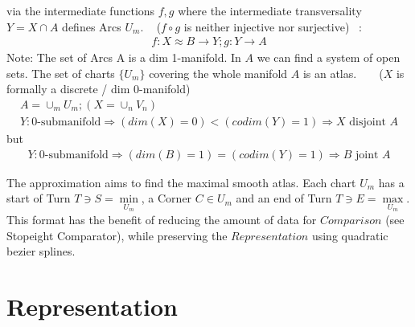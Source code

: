 \documentclass{report}
\begin{document}
via the intermediate functions $f,g$ where the intermediate transversality $Y = X \cap A$ defines Arcs $U_{m}$. ~\cite[]{Loring} ($f \circ g$ is neither injective nor surjective) ~\cite[]{LauresSzymik}:
\begin{align}
f: X \approx B \rightarrow Y; g: Y \rightarrow A
\end{align}
Note: The set of Arcs A is a dim 1-manifold. In $A$ we can find a system of open sets. The set of charts $\{U_{m}\}$ covering the whole manifold $A$ is an atlas. ~\cite[.1.]{Fomenko} ~\cite[]{Wall} ($X$ is formally a discrete / dim 0-manifold)
\begin{align}
A = \cup_{m}U_{m}; (X = \cup_{n}V_{n})\\
Y: \text{0-submanifold} \Rightarrow (dim(X)=0)<(codim(Y)=1) \Rightarrow X \text{ disjoint } A
\end{align}
but
\begin{align}
Y: \text{0-submanifold} \Rightarrow (dim(B)=1)=(codim(Y)=1) \Rightarrow B \text{ joint } A
\end{align}
\iffalse
Within $f$ we are assigning a sequence of three points to compact Hausdorf invervals ~\cite[\nopp 6.1.3.]{Mortad}:
\begin{equation}
\{x_{n}\}_{n \in \mathbb{N}} \mapsto \{S,C,E\}
\end{equation}\\
\fi
The approximation aims to find the maximal smooth atlas. Each chart $U_{m}$ has a start of Turn $T \ni S = \min \limits _{U_{m}}$, a Corner $C \in U_{m}$ and an end of Turn $T \ni E = \max \limits _{U_{m}}$. This format has the benefit of reducing the amount of data for $Comparison$ (see Stopeight Comparator), while preserving the $Representation$ using quadratic bezier splines.

\chapter{Representation}
\end{document}
